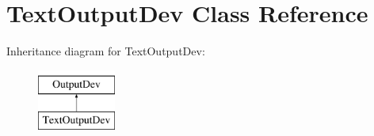 \hypertarget{class_text_output_dev}{}\section{Text\+Output\+Dev Class Reference}
\label{class_text_output_dev}
Inheritance diagram for Text\+Output\+Dev\+:\begin{figure}[H]
\begin{center}
\leavevmode
\includegraphics[height=2.000000cm]{class_text_output_dev}
\end{center}
\end{figure}
